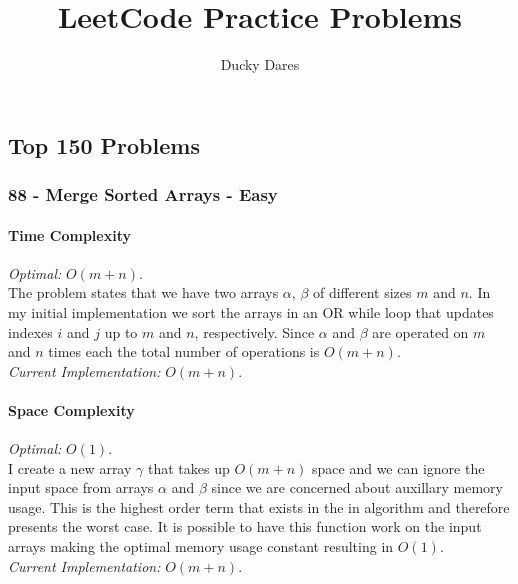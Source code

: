 \documentclass[11pt]{article}
\title{LeetCode Practice Problems}
\author{Ducky Dares}
\begin{document}
\maketitle


\raggedright
\subsection*{Top 150 Problems}
\subsubsection*{88 - Merge Sorted Arrays - Easy}

\paragraph{Time Complexity} \hfill \break
\textit{Optimal:} $O(m+n)$.\\

The problem states that we have two arrays $\alpha$, $\beta$ of different sizes $m$ and $n$. In my initial implementation we sort the arrays in an OR
while loop that updates indexes $i$ and $j$ up to $m$ and $n$, respectively. Since $\alpha$ and $\beta$ are operated on $m$ and $n$ times each the total number of
operations is $O(m + n)$.\\

\textit{Current Implementation:} $O(m + n)$.\\

\paragraph{Space Complexity} \hfill \break
\textit{Optimal:} $O(1)$.\\

I create a new array $\gamma$ that takes up $O(m + n)$ space and we can ignore the input space from arrays $\alpha$ and $\beta$ since we are concerned about auxillary memory usage.
This is the highest order term that exists in the in algorithm and therefore presents the worst case. It is possible to have this function work on the input arrays making 
the optimal memory usage constant resulting in $O(1)$.\\
\textit{Current Implementation:} $O(m + n)$.\\
\end{document}
